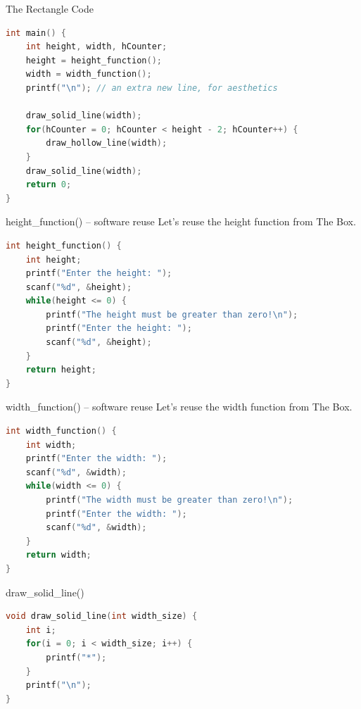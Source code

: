 \documentclass[graphics]{beamer}
\begin{document}
\begin{frame}[fragile]{The Rectangle Code}
    \begin{lstlisting}[language=C,basicstyle=\footnotesize,keywordstyle=\color{blue},commentstyle=\color{green},showstringspaces=false,stringstyle=\color{red}]
int main() {
    int height, width, hCounter;
    height = height_function();
    width = width_function();
    printf("\n"); // an extra new line, for aesthetics
    
    draw_solid_line(width);
    for(hCounter = 0; hCounter < height - 2; hCounter++) {
        draw_hollow_line(width);
    }
    draw_solid_line(width);
    return 0;
}
    \end{lstlisting}
\end{frame}

\begin{frame}[fragile]{height\_function() -- software reuse}
    Let's reuse the height function from The Box.
    \begin{lstlisting}[language=C,basicstyle=\footnotesize,keywordstyle=\color{blue},commentstyle=\color{green},showstringspaces=false,stringstyle=\color{red}]
int height_function() {
    int height;
    printf("Enter the height: ");
    scanf("%d", &height);
    while(height <= 0) {
        printf("The height must be greater than zero!\n");
        printf("Enter the height: ");
        scanf("%d", &height);
    }
    return height;
}
    \end{lstlisting}
\end{frame}

\begin{frame}[fragile]{width\_function() -- software reuse}
    Let's reuse the width function from The Box.
    \begin{lstlisting}[language=C,basicstyle=\footnotesize,keywordstyle=\color{blue},commentstyle=\color{green},showstringspaces=false,stringstyle=\color{red}]
int width_function() {
    int width;
    printf("Enter the width: ");
    scanf("%d", &width);
    while(width <= 0) {
        printf("The width must be greater than zero!\n");
        printf("Enter the width: ");
        scanf("%d", &width);
    }
    return width;
}
    \end{lstlisting}
\end{frame}

\begin{frame}[fragile]{draw\_solid\_line()}
    \begin{lstlisting}[language=C,basicstyle=\footnotesize,keywordstyle=\color{blue},commentstyle=\color{green},showstringspaces=false,stringstyle=\color{red}]
void draw_solid_line(int width_size) {
    int i;
    for(i = 0; i < width_size; i++) {
        printf("*");
    }
    printf("\n");
}
    \end{lstlisting}
\end{frame}
\end{document}

